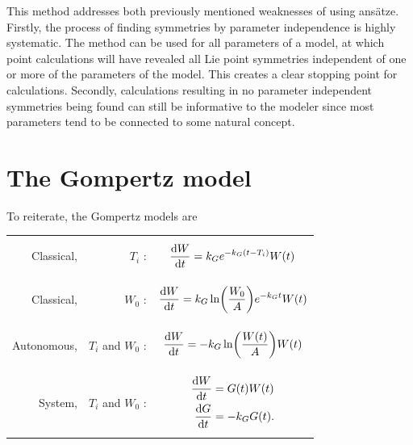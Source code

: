 This method addresses both previously mentioned weaknesses of using ansätze.
Firstly, the process of finding symmetries by parameter independence is highly systematic.
The method can be used for all parameters of a model, at which point calculations will have revealed all Lie point symmetries independent of one or more of the parameters of the model.
This creates a clear stopping point for calculations.
Secondly, calculations resulting in no parameter independent symmetries being found can still be informative to the modeler since most parameters tend to be connected to some natural concept.

\section{The Gompertz model}
To reiterate, the Gompertz models are\par\noindent
\begin{tabularx}{\linewidth}{rrM}
  Classical, & \(T_i\) :&
  \begin{minipage}{\linewidth}
    \begin{equation}
      \diff{W}{t} = k_G e^{-k_G (t - T_i)} W(t) \label{eq:gompertz-classical-ti^param}
    \end{equation}
  \end{minipage}\tabularnewline
  Classical, & \(W_0\) :&
  \begin{minipage}{\linewidth}
    \begin{equation}
      \diff{W}{t} = k_G \ln(\frac{W_0}{A})e^{-k_G t} W(t) \label{eq:gompertz-classical-w0^param}
    \end{equation}
  \end{minipage}\tabularnewline
  Autonomous, & \(T_i\) and \(W_0\) :&
  \begin{minipage}{\linewidth}
    \begin{equation}
      \diff{W}{t} = -k_G \ln(\frac{W(t)}{A}) W(t) \label{eq:gompertz-autonomous^param}
    \end{equation}
  \end{minipage}\tabularnewline
  System, & \(T_i\) and \(W_0\) :&
  \begin{minipage}{\linewidth}%
    {\begin{subequations}\label{eq:gompertz-system^param}
      \begin{align}
        \diff{W}{t} &= G(t) W(t) \label{eq:gompertz-system-a^param}\\
        \diff{G}{t} &= -k_G G(t). \label{eq:gompertz-system-b^param}
      \end{align}
    \end{subequations}}%
  \end{minipage}
\end{tabularx}

